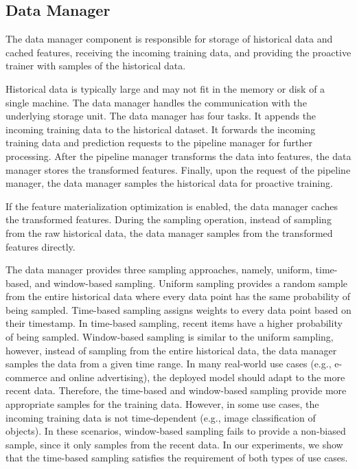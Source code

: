 \subsection{Data Manager} \label{data-manager}
The data manager component is responsible for storage of historical data and cached features, receiving the incoming training data, and providing the proactive trainer with samples of the historical data.

Historical data is typically large and may not fit in the memory or disk of a single machine. 
The data manager handles the communication with the underlying storage unit.
The data manager has four tasks.
It appends the incoming training data to the historical dataset.
It forwards the incoming training data and prediction requests to the pipeline manager for further processing.
After the pipeline manager transforms the data into features, the data manager stores the transformed features.
Finally, upon the request of the pipeline manager, the data manager samples the historical data for proactive training.

If the feature materialization optimization is enabled, the data manager caches the transformed features.
During the sampling operation, instead of sampling from the raw historical data, the data manager samples from the transformed features directly.

The data manager provides three sampling approaches, namely, uniform, time-based, and window-based sampling.
Uniform sampling provides a random sample from the entire historical data where every data point has the same probability of being sampled.
Time-based sampling assigns weights to every data point based on their timestamp.
In time-based sampling, recent items have a higher probability of being sampled.
Window-based sampling is similar to the uniform sampling, however, instead of sampling from the entire historical data, the data manager samples the data from a given time range. 
In many real-world use cases (e.g., e-commerce and online advertising), the deployed model should adapt to the more recent data.
Therefore, the time-based and window-based sampling provide more appropriate samples for the training data.
However, in some use cases, the incoming training data is not time-dependent (e.g., image classification of objects).
In these scenarios, window-based sampling fails to provide a non-biased sample, since it only samples from the recent data.
In our experiments, we show that the time-based sampling satisfies the requirement of both types of use cases.

